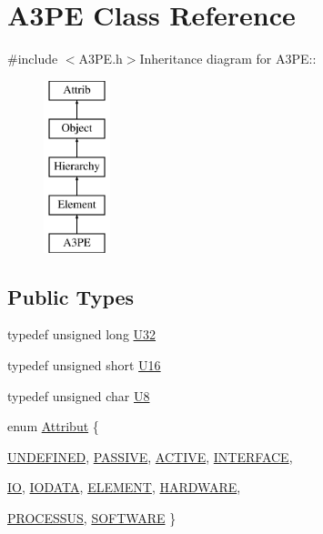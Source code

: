 \hypertarget{classA3PE}{
\section{A3PE Class Reference}
\label{classA3PE}
}


{\ttfamily \#include $<$A3PE.h$>$}Inheritance diagram for A3PE::\begin{figure}[H]
\begin{center}
\leavevmode
\includegraphics[height=5cm]{classA3PE}
\end{center}
\end{figure}
\subsection*{Public Types}
\begin{DoxyCompactItemize}
\item 
typedef unsigned long \hyperlink{classA3PE_af2773f4a4f8e9940b1e008386c4e908c}{U32}
\item 
typedef unsigned short \hyperlink{classA3PE_a2ee28b2899c3cc4f22821b4138758c28}{U16}
\item 
typedef unsigned char \hyperlink{classA3PE_ab70116c2810a9a01142a33c69fdda039}{U8}
\item 
enum \hyperlink{classAttrib_a69e171d7cc6417835a5a306d3c764235}{Attribut} \{ \par
\hyperlink{classAttrib_a69e171d7cc6417835a5a306d3c764235a3a8da2ab97dda18aebab196fe4100531}{UNDEFINED}, 
\hyperlink{classAttrib_a69e171d7cc6417835a5a306d3c764235a2bfb2af57b87031d190a05fe25dd92ed}{PASSIVE}, 
\hyperlink{classAttrib_a69e171d7cc6417835a5a306d3c764235a3b1fec929c0370d1436f2f06e298fb0d}{ACTIVE}, 
\hyperlink{classAttrib_a69e171d7cc6417835a5a306d3c764235aa27c16b480a369ea4d18b07b2516bbc7}{INTERFACE}, 
\par
\hyperlink{classAttrib_a69e171d7cc6417835a5a306d3c764235a1420a5b8c0540b2af210b6975eded7f9}{IO}, 
\hyperlink{classAttrib_a69e171d7cc6417835a5a306d3c764235a0af3b0d0ac323c1704e6c69cf90add28}{IODATA}, 
\hyperlink{classAttrib_a69e171d7cc6417835a5a306d3c764235a7788bc5dd333fd8ce18562b269c9dab1}{ELEMENT}, 
\hyperlink{classAttrib_a69e171d7cc6417835a5a306d3c764235a61ceb22149f365f1780d18f9d1459423}{HARDWARE}, 
\par
\hyperlink{classAttrib_a69e171d7cc6417835a5a306d3c764235a75250e29692496e73effca2c0330977f}{PROCESSUS}, 
\hyperlink{classAttrib_a69e171d7cc6417835a5a306d3c764235a103a67cd0b8f07ef478fa45d4356e27b}{SOFTWARE}
 \}
\end{DoxyCompactItemize}
